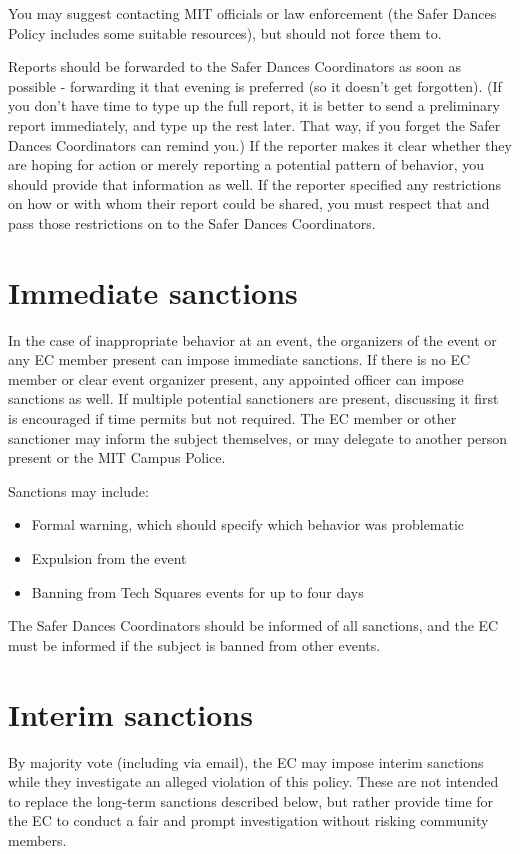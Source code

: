 \documentclass{article}
\begin{document}
You may suggest contacting MIT officials or law enforcement (the Safer Dances Policy includes some suitable resources), but should not force them to.

Reports should be forwarded to the Safer Dances Coordinators as soon as possible - forwarding it that evening is preferred (so it doesn't get forgotten). (If you don't have time to type up the full report, it is better to send a preliminary report immediately, and type up the rest later. That way, if you forget the Safer Dances Coordinators can remind you.) If the reporter makes it clear whether they are hoping for action or merely reporting a potential pattern of behavior, you should provide that information as well. If the reporter specified any restrictions on how or with whom their report could be shared, you must respect that and pass those restrictions on to the Safer Dances Coordinators. 


\section{Immediate sanctions}

In the case of inappropriate behavior at an event, the organizers of the event or any EC member present can impose immediate sanctions. If there is no EC member or clear event organizer present, any appointed officer can impose sanctions as well. If multiple potential sanctioners are present, discussing it first is encouraged if time permits but not required. The EC member or other sanctioner may inform the subject themselves, or may delegate to another person present or the MIT Campus Police.

Sanctions may include:
\begin{itemize}
\item Formal warning, which should specify which behavior was problematic
\item Expulsion from the event
\item Banning from Tech Squares events for up to four days
\end{itemize}

The Safer Dances Coordinators should be informed of all sanctions, and the EC must be informed if the subject is banned from other events.


\section{Interim sanctions}

By majority vote (including via email), the EC may impose interim sanctions while they investigate an alleged violation of this policy. These are not intended to replace the long-term sanctions described below, but rather provide time for the EC to conduct a fair and prompt investigation without risking community members.
\end{document}
